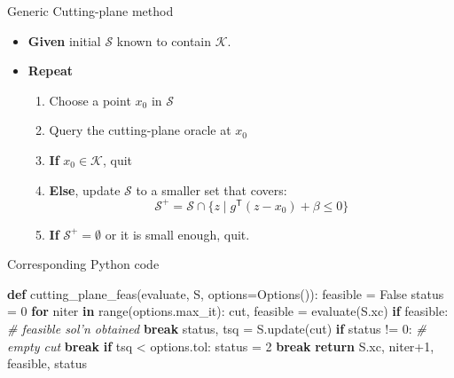 \documentclass[
  ignorenonframetext,
  aspectratio=169,
  serif,onlymath]{beamer}
\newenvironment{Shaded}{}{}
\newcommand{\BuiltInTok}[1]{#1}
\newcommand{\CommentTok}[1]{\textcolor[rgb]{0.38,0.63,0.69}{\textit{#1}}}
\newcommand{\ControlFlowTok}[1]{\textcolor[rgb]{0.00,0.44,0.13}{\textbf{#1}}}
\newcommand{\DecValTok}[1]{\textcolor[rgb]{0.25,0.63,0.44}{#1}}
\newcommand{\KeywordTok}[1]{\textcolor[rgb]{0.00,0.44,0.13}{\textbf{#1}}}
\newcommand{\NormalTok}[1]{#1}
\newcommand{\OperatorTok}[1]{\textcolor[rgb]{0.40,0.40,0.40}{#1}}
\newcommand{\VariableTok}[1]{\textcolor[rgb]{0.10,0.09,0.49}{#1}}
\providecommand{\tightlist}{%
  \setlength{\itemsep}{0pt}\setlength{\parskip}{0pt}}
\begin{document}
\begin{frame}{Generic Cutting-plane method}
\protect\hypertarget{generic-cutting-plane-method}{}

\begin{itemize}
\tightlist
\item
  \textbf{Given} initial \(\mathcal{S}\) known to contain
  \(\mathcal{K}\).
\item
  \textbf{Repeat}

  \begin{enumerate}
  \tightlist
  \item
    Choose a point \(x_0\) in \(\mathcal{S}\)
  \item
    Query the cutting-plane oracle at \(x_0\)
  \item
    \textbf{If} \(x_0 \in \mathcal{K}\), quit
  \item
    \textbf{Else}, update \(\mathcal{S}\) to a smaller set that covers:
    \[\mathcal{S}^+ = \mathcal{S} \cap \{z \mid g^\mathsf{T} (z - x_0) + \beta \le 0\}\]
  \item
    \textbf{If} \(\mathcal{S}^+ = \emptyset\) or it is small enough,
    quit.
  \end{enumerate}
\end{itemize}

\end{frame}

\begin{frame}[fragile]{Corresponding Python code}
\protect\hypertarget{corresponding-python-code}{}

\scriptsize

\begin{Shaded}
\begin{Highlighting}[]
\KeywordTok{def}\NormalTok{ cutting_plane_feas(evaluate, S, options}\OperatorTok{=}\NormalTok{Options()):}
\NormalTok{    feasible }\OperatorTok{=} \VariableTok{False}
\NormalTok{    status }\OperatorTok{=} \DecValTok{0}
    \ControlFlowTok{for}\NormalTok{ niter }\KeywordTok{in} \BuiltInTok{range}\NormalTok{(options.max_it):}
\NormalTok{        cut, feasible }\OperatorTok{=}\NormalTok{ evaluate(S.xc)}
        \ControlFlowTok{if}\NormalTok{ feasible:  }\CommentTok{# feasible sol'n obtained}
            \ControlFlowTok{break}
\NormalTok{        status, tsq }\OperatorTok{=}\NormalTok{ S.update(cut)}
        \ControlFlowTok{if}\NormalTok{ status }\OperatorTok{!=} \DecValTok{0}\NormalTok{:  }\CommentTok{# empty cut}
            \ControlFlowTok{break}
        \ControlFlowTok{if}\NormalTok{ tsq }\OperatorTok{<}\NormalTok{ options.tol:}
\NormalTok{            status }\OperatorTok{=} \DecValTok{2}
            \ControlFlowTok{break}
    \ControlFlowTok{return}\NormalTok{ S.xc, niter}\OperatorTok{+}\DecValTok{1}\NormalTok{, feasible, status}
\end{Highlighting}
\end{Shaded}

\end{frame}
\end{document}
